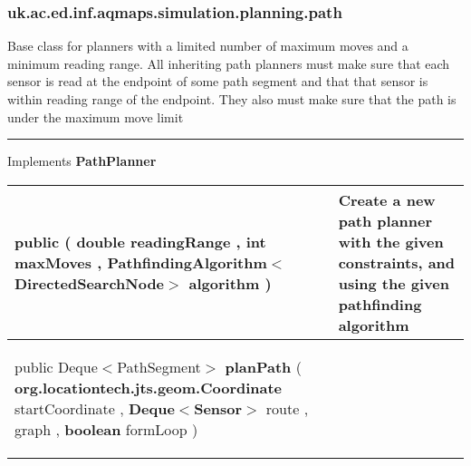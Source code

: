 \subsubsection*{ uk.ac.ed.inf.aqmaps.simulation.planning.path }
 {\scriptsize Base class for planners with a limited number of maximum moves and a\newline%
 minimum reading range. All inheriting path planners must make sure that each sensor is read at the endpoint of some path segment\newline%
 and that that sensor is within reading range of the endpoint. They also must make sure that the path is under the maximum move limit
 
\vspace*{4pt} \hrule \vspace*{3pt}
Implements \textbf{ PathPlanner }
\vspace*{-5pt} 
\begin{tabularx}{\linewidth}{m{}|m{}}
\label{tab:BasePathPlanner}
\begin{raggedleft}public  \textbf{\hyperref[tab:BasePathPlanner]{\color{blue}{BasePathPlanner}} }(\newline \hfill 
\hspace*{ 5pt} \textbf{double} readingRange , \newline
 \hspace*{ 5pt} \textbf{int} maxMoves , \newline
 \hspace*{ 5pt} \textbf{PathfindingAlgorithm$<$DirectedSearchNode$>$} algorithm  )
\end{raggedleft} &
 Create a new path planner with the given constraints, and using the given pathfinding algorithm\\ \hline 
\begin{raggedleft}public Deque$<$PathSegment$>$ \textbf{planPath }(\newline \hfill 
\hspace*{ 5pt} \textbf{org.locationtech.jts.geom.Coordinate} startCoordinate , \newline
 \hspace*{ 5pt} \textbf{Deque$<$Sensor$>$} route , \newline
 \hspace*{ 5pt} \textbf{\hyperref[tab:ConstrainedTreeGraph]{\color{blue}{ConstrainedTreeGraph}}} graph , \newline
 \hspace*{ 5pt} \textbf{boolean} formLoop  )

\end{raggedleft}
\end{tabularx}}

